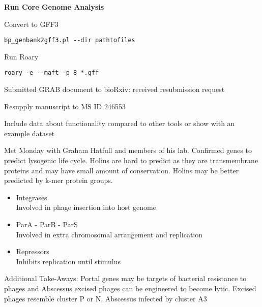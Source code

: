 \documentclass[idxtotoc,hyperref,openany,oneside]{labbook} %
\begin{document}
\textbf{Run Core Genome Analysis}

\vspace{0.3cm}

Convert to GFF3

\begin{verbatim}
bp_genbank2gff3.pl --dir pathtofiles
\end{verbatim}


Run Roary

\begin{verbatim}
roary -e --maft -p 8 *.gff
\end{verbatim}






Submitted GRAB document to bioRxiv: received resubmission request

Resupply manuscript to MS ID 246553

Include data about functionality compared to other tools or show with an example dataset





Met Monday with Graham Hatfull and members of his lab. Confirmed genes to predict lysogenic life cycle. Holins are hard to predict as they are transmembrane proteins and may have small amount of conservation. Holins may be better predicted by k-mer protein groups. 

\begin{itemize}
\item Integrases \\
Involved in phage insertion into host genome
\item ParA - ParB - ParS \\
Involved in extra chromosomal arrangement and replication
\item Repressors \\
Inhibits replication until stimulus 
\end{itemize}

Additional Take-Aways: Portal genes may be targets of bacterial resistance to phages and Abscessus excised phages can be engineered to become lytic.  Excised phages resemble cluster P or N, Abscessus infected by cluster A3\\
\end{document}
